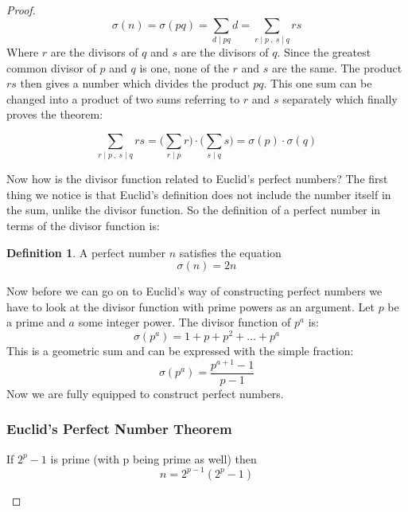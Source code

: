\documentclass{article}
\theoremstyle{definition}
\newtheorem{definition}{Definition}[section]
\begin{document}
\begin{proof}
    \begin{equation}
        \sigma(n) = \sigma(pq) = \sum _{d\mid pq} d =  \sum_{r\mid p\:, \: s \mid q} rs 
    \end{equation}
Where $r$ are the divisors of $q$ and $s$ are the divisors of $q$. Since the greatest common divisor of $p$ and $q$  is one, none of the $r$ and $s$ are the same. The product $rs$ then gives a number which divides the product $pq$. This one sum can be changed into a product of two sums referring to $r$ and $s$ separately which finally proves the theorem:

    \begin{equation}
        \sum_{r\mid p\:, \: s \mid q} rs  = \Big(\sum _{r\mid p} r\Big) \cdot \Big(\sum_{s\mid q}s \Big)= \sigma(p) \cdot \sigma(q)
    \end{equation}

Now how is the divisor function related to Euclid's perfect numbers? The first thing we notice is that Euclid's definition does not include the number itself in the sum, unlike the divisor function. So the definition of a perfect number in terms of the divisor function is:
\begin{definition}
    A perfect number $n$ satisfies the equation
    \begin{equation}
        \sigma(n) = 2n
    \end{equation}
\end{definition}

Now before we can go on to Euclid's way of constructing perfect numbers we have to look at the divisor function with prime powers as an argument. 
Let $p$ be a prime and $a$ some integer power. The divisor function of $p^a$ is:
\begin{equation}
    \sigma(p^a) = 1 + p + p^2 + ... + p^a
\end{equation}
This is a geometric sum and can be expressed with the simple fraction:
\begin{equation}
    \sigma(p^a) = \frac{p^{a+1}-1}{p-1}
\end{equation}
Now we are fully equipped to construct perfect numbers.
\subsubsection{Euclid's Perfect Number Theorem}
\begin{theorem}
    If $2^p-1$ is prime (with p being prime as well) then 
    \begin{equation}
       n =  2^{p-1}(2^p-1)
    \end{equation}


\end{theorem}
\end{proof}
\end{document}
